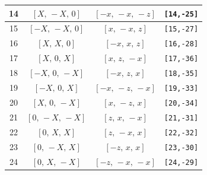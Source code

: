 \documentclass[fleqn,8pt]{jsarticle}
\begin{document}
\begin{longtable}{cccc}
14 & $\left[ X,\, - X,\, 0 \right]$ & $\left[ - x,\, - x,\, - z \right]$ & {\tt [14,-25]} \\ \hline
15 & $\left[ - X,\, - X,\, 0 \right]$ & $\left[ x,\, - x,\, z \right]$ & {\tt [15,-27]} \\ \hline
16 & $\left[ X,\, X,\, 0 \right]$ & $\left[ - x,\, x,\, z \right]$ & {\tt [16,-28]} \\ \hline
17 & $\left[ X,\, 0,\, X \right]$ & $\left[ x,\, z,\, - x \right]$ & {\tt [17,-36]} \\ \hline
18 & $\left[ - X,\, 0,\, - X \right]$ & $\left[ - x,\, z,\, x \right]$ & {\tt [18,-35]} \\ \hline
19 & $\left[ - X,\, 0,\, X \right]$ & $\left[ - x,\, - z,\, - x \right]$ & {\tt [19,-33]} \\ \hline
20 & $\left[ X,\, 0,\, - X \right]$ & $\left[ x,\, - z,\, x \right]$ & {\tt [20,-34]} \\ \hline
21 & $\left[ 0,\, - X,\, - X \right]$ & $\left[ z,\, x,\, - x \right]$ & {\tt [21,-31]} \\ \hline
22 & $\left[ 0,\, X,\, X \right]$ & $\left[ z,\, - x,\, x \right]$ & {\tt [22,-32]} \\ \hline
23 & $\left[ 0,\, - X,\, X \right]$ & $\left[ - z,\, x,\, x \right]$ & {\tt [23,-30]} \\ \hline
24 & $\left[ 0,\, X,\, - X \right]$ & $\left[ - z,\, - x,\, - x \right]$ & {\tt [24,-29]} \\
\end{longtable}
\renewcommand{\arraystretch}{1.2}
\end{document}
